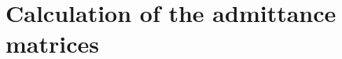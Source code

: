 \documentclass[nols,a4paper,twoside,notoc,fleqn]{tufte-book}
\begin{document}




%
%	
%	
%	
%
%
%	
%	
%	
%	
%	
%	
%	


\newpage
\section{Calculation of the admittance matrices}  \label{Y_calculation}
\end{document}
